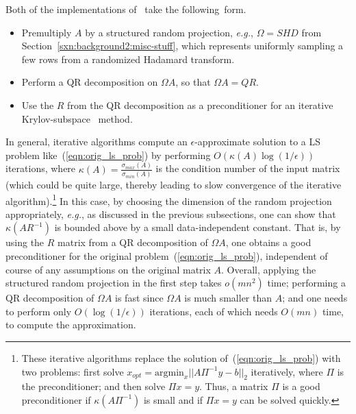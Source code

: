\documentclass[twoside]{article}
\begin{document}
Both of the implementations of~\cite{RT08,AMT10} take the following~form.
\begin{itemize}
\item
Premultiply $A$ by a structured random projection, \emph{e.g.}, 
$\Omega = S H D$ from Section~\ref{sxn:background2:misc-stuff}, which 
represents uniformly sampling a few rows from a randomized Hadamard 
transform.
\item
Perform a QR decomposition on $\Omega A$, so that $\Omega A = QR$.
\item
Use the $R$ from the QR decomposition as a preconditioner for an iterative
Krylov-subspace~\cite{GVL96} method.
\end{itemize}
In general, iterative algorithms compute an $\epsilon$-approximate solution 
to a LS problem like~(\ref{eqn:orig_ls_prob}) by performing 
$O(\kappa(A)\log(1/\epsilon))$ iterations, where 
$\kappa(A)=\frac{\sigma_{max}(A)}{\sigma_{min}(A)}$ is the 
condition number of the input matrix (which could be quite large, thereby 
leading to slow convergence of the iterative algorithm).\footnote{These iterative algorithms replace the solution 
of~(\ref{eqn:orig_ls_prob}) with two problems: first solve 
$x_{opt} = \mbox{argmin}_x ||A \Pi^{-1}y-b||_2 $ iteratively, 
where $\Pi$ is the preconditioner; and then solve $\Pi x = y$.
Thus, a matrix $\Pi$ is a good preconditioner if $\kappa(A\Pi^{-1})$ 
is small and if $\Pi x = y$ can be solved quickly.}
In this case, by choosing the dimension of the random projection 
appropriately, \emph{e.g.}, as discussed in the previous subsections, one 
can show that $\kappa(AR^{-1})$ is bounded above by a small data-independent 
constant.
That is, by using the $R$ matrix from a QR decomposition of $\Omega A$, one 
obtains a good preconditioner for the original 
problem~(\ref{eqn:orig_ls_prob}), independent of course of any assumptions 
on the original matrix $A$.
Overall, 
applying the structured random projection in the first step takes $o(mn^2)$ 
time; 
performing a QR decomposition of $\Omega A$ is fast since $\Omega A$ is much 
smaller than $A$; 
and one needs to perform only $O(\log(1/\epsilon))$ iterations, each of 
which needs $O(mn)$ time, to compute the approximation.
\end{document}
